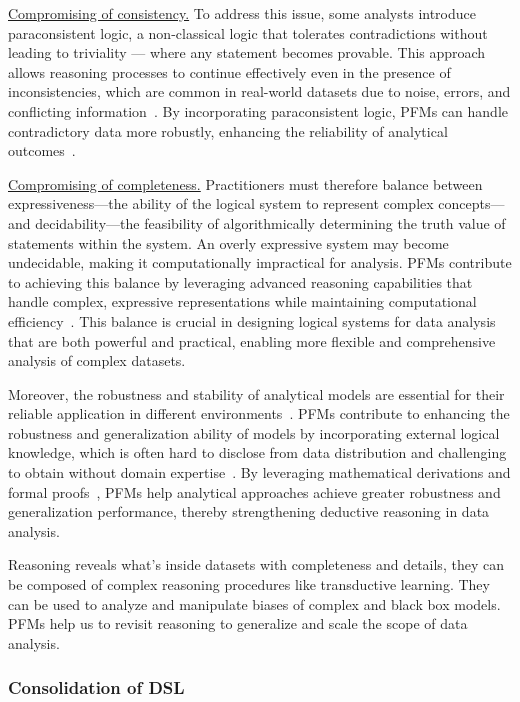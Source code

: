   \underline{Compromising of consistency.} To address this issue, some analysts introduce paraconsistent logic, a non-classical logic that tolerates contradictions without leading to triviality — where any statement becomes provable. This approach allows reasoning processes to continue effectively even in the presence of inconsistencies, which are common in real-world datasets due to noise, errors, and conflicting information~\cite{022batini2009methodologies}. By incorporating paraconsistent logic, PFMs can handle contradictory data more robustly, enhancing the reliability of analytical outcomes~\cite{037little2019statistical}.
  
  \underline{Compromising of completeness.} Practitioners must therefore balance between expressiveness—the ability of the logical system to represent complex concepts—and decidability—the feasibility of algorithmically determining the truth value of statements within the system. An overly expressive system may become undecidable, making it computationally impractical for analysis. PFMs contribute to achieving this balance by leveraging advanced reasoning capabilities that handle complex, expressive representations while maintaining computational efficiency~\cite{Pei2023CanLL, Wang2024TheoremLlamaTG}. This balance is crucial in designing logical systems for data analysis that are both powerful and practical, enabling more flexible and comprehensive analysis of complex datasets.
  
  Moreover, the robustness and stability of analytical models are essential for their reliable application in different environments~\cite{029dietterich1995overfitting}. PFMs contribute to enhancing the robustness and generalization ability of models by incorporating external logical knowledge, which is often hard to disclose from data distribution and challenging to obtain without domain expertise~\cite{031guyon2003introduction}. By leveraging mathematical derivations and formal proofs~\cite{wang2023large}, PFMs help analytical approaches achieve greater robustness and generalization performance, thereby strengthening deductive reasoning in data analysis.
  
  Reasoning reveals what's inside datasets with completeness and details, they can be composed of complex reasoning procedures like transductive learning. They can be used to analyze and manipulate biases of complex and black box models. PFMs help us to revisit reasoning to generalize and scale the scope of data analysis.
  
  \subsubsection{Consolidation of DSL}\label{sec:consolidate_dsl}
  
